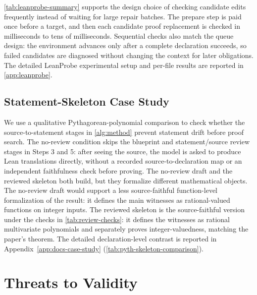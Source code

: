 \documentclass{article}
\newcommand{\lean}{Lean\xspace}
\begin{document}
\cref{tab:leanprobe-summary} supports the design choice of checking candidate edits frequently instead of waiting for large repair batches.
The prepare step is paid once before a target, and then each candidate proof replacement is checked in milliseconds to tens of milliseconds.
Sequential checks also match the queue design: the environment advances only after a complete declaration succeeds, so failed candidates are diagnosed without changing the context for later obligations.
The detailed LeanProbe experimental setup and per-file results are reported in \cref{app:leanprobe}.

\subsection{Statement-Skeleton Case Study}

We use a qualitative Pythagorean-polynomial comparison to check whether the source-to-statement stages in \cref{alg:method} prevent statement drift before proof search.
The no-review condition skips the blueprint and statement/source review stages in Steps 3 and 5: after seeing the source, the model is asked to produce \lean translations directly, without a recorded source-to-declaration map or an independent faithfulness check before proving.
The no-review draft and the reviewed skeleton both build, but they formalize different mathematical objects.
The no-review draft would support a less source-faithful function-level formalization of the result: it defines the main witnesses as rational-valued functions on integer inputs.
The reviewed skeleton is the source-faithful version under the checks in \cref{tab:review-checks}: it defines the witnesses as rational multivariate polynomials and separately proves integer-valuedness, matching the paper's theorem.
The detailed declaration-level contrast is reported in Appendix~\ref{app:docs-case-study} (\cref{tab:pyth-skeleton-comparison}).

\section{Threats to Validity}
\label{sec:threats}
\end{document}
